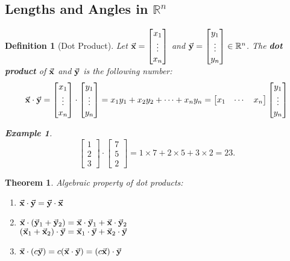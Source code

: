\documentclass[12pt, a4paper]{article}
\newtheorem{thm}{Theorem}[subsection]
\newtheorem{df}{Definition}[subsection]
\newtheorem{eg}{Example}[subsection]
\def\R{{\mathbb{R}}}
\def\vecx{\va{x}}
\def\vecy{\va{y}}
\begin{document}
\subsection{Lengths and Angles in $\R^n$}
\begin{df}[Dot Product]
	Let $\vecx=\begin{bmatrix}x_1\\\vdots\\x_n\end{bmatrix}$ and $\vecy=\begin{bmatrix}y_1\\\vdots\\y_n\end{bmatrix}\in\R^n$. The \textbf{dot product} of $\vecx$ and $\vecy$ is the following number: \[\vecx\cdot\vecy=\begin{bmatrix}x_1\\\vdots\\x_n\end{bmatrix}\cdot\begin{bmatrix}y_1\\\vdots\\y_n\end{bmatrix}=x_1y_1+x_2y_2+\cdots+x_ny_n=\begin{bmatrix}x_1&\cdots&x_n\end{bmatrix}\begin{bmatrix}y_1\\\vdots\\y_n\end{bmatrix}\]	
	\begin{eg}
		\[\begin{bmatrix}1\\2\\3\end{bmatrix}\cdot\begin{bmatrix}7\\5\\2\end{bmatrix}=1\times7+2\times5+3\times2=23.\]	
	\end{eg}
\end{df}
\begin{thm}
	Algebraic property of dot products:
	\begin{enumerate}
		\item $\vecx\cdot\vecy=\vecy\cdot\vecx$
		\item $\vecx\cdot(\vecy_1+\vecy_2)=\vecx\cdot\vecy_1+\vecx\cdot\vecy_2$\\
			$(\vecx_1+\vecx_2)\cdot\vecy=\vecx_1\cdot\vecy+\vecx_2\cdot\vecy$
		\item $\vecx\cdot(c\vecy)=c(\vecx\cdot\vecy)=(c\vecx)\cdot\vecy$
	\end{enumerate}
\end{thm}
\end{document}
